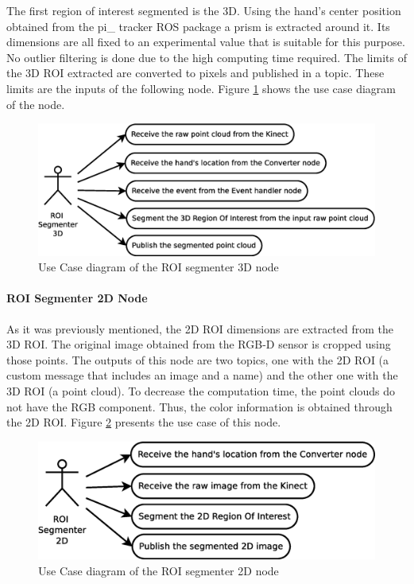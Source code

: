 The first region of interest segmented is the 3D. Using the hand's center position obtained from the pi\_ tracker ROS package a prism is extracted around it. Its dimensions are all fixed to an experimental value that is suitable for this purpose. 
No outlier filtering is done due to the high computing time required.  
The limits of the 3D ROI extracted are converted to pixels and published in a topic. These limits are the inputs of the following node. 
Figure \ref{uc_roi3d} shows the use case diagram of the node. 

\begin{figure}[H]
\begin{center}
	\includegraphics[scale=0.4]{img/diagrams/uc_roi_segmenter_3d.eps}
			\caption[Use case diagram ROI segmenter 3D node]{Use Case diagram of the ROI segmenter 3D node}
		\label{uc_roi3d}	

\end{center}
\end{figure}

\paragraph{ROI Segmenter 2D Node\\[0.5cm]}
As it was previously mentioned, the 2D ROI dimensions are extracted from the 3D ROI. The original image obtained from the RGB-D sensor is cropped using those points. 
The outputs of this node are two topics, one with the 2D ROI (a custom message that includes an image and a name) and the other one with the 3D ROI (a point cloud).
To decrease the computation time, the point clouds do not have the RGB component. Thus, the color information is obtained through the 2D ROI. 
Figure \ref{uc_roi2d} presents the use case of this node. 
\begin{figure}[H]
\begin{center}
	\includegraphics[scale=0.4]{img/diagrams/uc_roi_segmenter_2d.eps}
			\caption[Use case diagram ROI segmenter 2D node]{Use Case diagram of the ROI segmenter 2D node}
		\label{uc_roi2d}
\end{center}
\end{figure}

